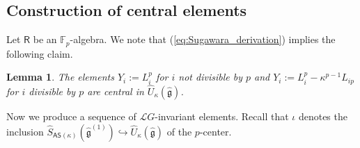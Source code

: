 \documentclass{amsart}
\newtheorem{Cor}[Thm]{Corollary}
\newtheorem{Lem}[Thm]{Lemma}
\theoremstyle{definition}
\newcommand{\Ring}{\mathsf{R}}
\newcommand{\g}{\mathfrak{g}}
\newcommand{\hg}{\hat{\mathfrak{g}}}
\newcommand{\F}{\mathbb{F}}
\newcommand{\Z}{\mathbb{Z}}
\newcommand{\Loop}{\mathscr{L}}
\numberwithin{equation}{section}
\begin{document}
\subsection{Construction of central elements}
Let $\Ring$ be an $\F_p$-algebra. We note that (\ref{eq:Sugawara_derivation}) implies the following claim. 

\begin{Lem}\label{Lem:central_1}
The elements 
$Y_i:=L_i^p$ for $i$ not divisible by $p$ and $Y_i:=L_i^p-\kappa^{p-1}L_{ip}$ for $i$ divisible by
$p$ are central in $\widehat{U}_{\kappa}(\hg)$.
\end{Lem}

Now we produce a sequence of $\Loop G$-invariant elements. Recall that $\iota$ denotes the inclusion $\widehat{S}_{\mathsf{AS}(\kappa)}(\hat{\g}^{(1)})\hookrightarrow \widehat{U}_\kappa(\hat{\g})$ of the $p$-center.
%

\end{document}
